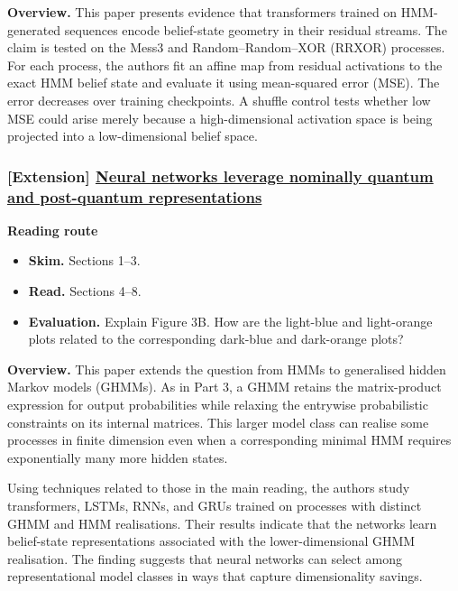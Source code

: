 \documentclass[11pt]{article}
\begin{document}
  \textbf{Overview.} This paper presents evidence that transformers trained on
  HMM-generated sequences encode belief-state geometry in their residual
  streams. The claim is tested on the Mess3 and Random--Random--XOR (RRXOR)
  processes. For each process, the authors fit an affine map from residual
  activations to the exact HMM belief state and evaluate it using mean-squared
  error (MSE). The error decreases over training checkpoints. A shuffle
  control tests whether low MSE could arise merely because a high-dimensional
  activation space is being projected into a low-dimensional belief space.

\subsubsection{[Extension] \href{https://arxiv.org/pdf/2507.07432}{Neural networks leverage nominally quantum and post-quantum representations}}
  \textbf{Reading route}
\begin{itemize}
    \item \textbf{Skim.} Sections 1--3.
    \item \textbf{Read.} Sections 4--8.
    \item \textbf{Evaluation.} Explain Figure 3B. How are the light-blue and light-orange
      plots related to the corresponding dark-blue and dark-orange plots?
  \end{itemize}

  \textbf{Overview.} This paper extends the question from HMMs to generalised
  hidden Markov models (GHMMs). As in Part 3, a GHMM retains the matrix-product
  expression for output probabilities while relaxing the entrywise
  probabilistic constraints on its internal matrices. This larger model class
  can realise some processes in finite dimension even when a corresponding
  minimal HMM requires exponentially many more hidden states.

  Using techniques related to those in the main reading, the authors study
  transformers, LSTMs, RNNs, and GRUs trained on processes with distinct GHMM
  and HMM realisations. Their results indicate that the networks learn
  belief-state representations associated with the lower-dimensional GHMM
  realisation. The finding suggests that neural networks can select among
  representational model classes in ways that capture dimensionality savings.
\end{document}
